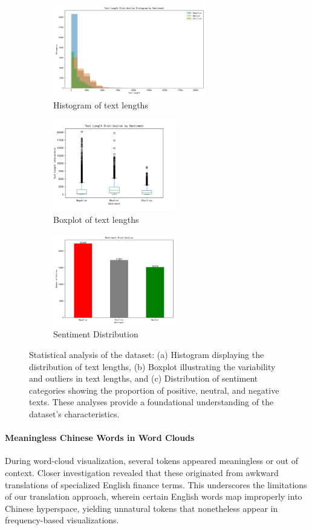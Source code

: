 \documentclass[12pt]{article}
\begin{document}
\begin{figure}[H]
	\centering
	\begin{subfigure}[b]{0.32\textwidth}
		\includegraphics[height=4cm]{text_length_histogram.png}
		\caption{Histogram of text lengths}
	\end{subfigure}
	\hfill
	\begin{subfigure}[b]{0.32\textwidth}
		\includegraphics[height=4cm]{text_length_boxplot.png}
		\caption{Boxplot of text lengths}
	\end{subfigure}
	\hfill
	\begin{subfigure}[b]{0.32\textwidth}
		\includegraphics[height=4cm]{sentiment_distribution.png}
		\caption{Sentiment Distribution}
	\end{subfigure}
	\caption{Statistical analysis of the dataset: (a) Histogram displaying the distribution of text lengths, (b) Boxplot illustrating the variability and outliers in text lengths, and (c) Distribution of sentiment categories showing the proportion of positive, neutral, and negative texts. These analyses provide a foundational understanding of the dataset's characteristics.}
	\label{fig:sentiment_distribution}
\end{figure}

\paragraph{Meaningless Chinese Words in Word Clouds}
During word-cloud visualization, several tokens appeared meaningless or out of context. Closer investigation revealed that these originated from awkward translations of specialized English finance terms. This underscores the limitations of our translation approach, wherein certain English words map improperly into Chinese hyperspace, yielding unnatural tokens that nonetheless appear in frequency-based visualizations.
\end{document}
